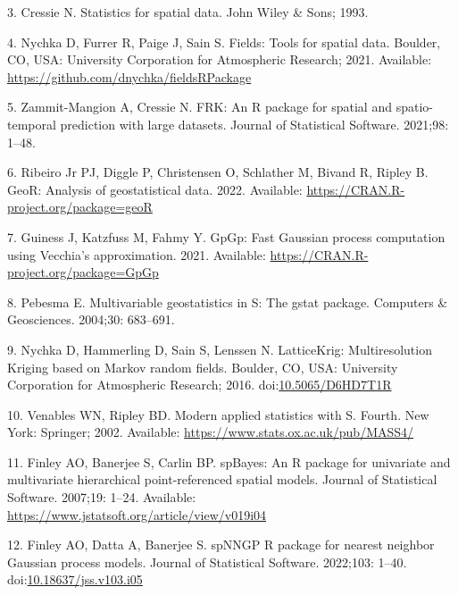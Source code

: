 \documentclass[10pt,letterpaper]{article}
\begin{document}
\leavevmode\hypertarget{ref-cressie1993statistics}{}%
3. Cressie N. Statistics for spatial data. John Wiley \& Sons; 1993.

\leavevmode\hypertarget{ref-nychka2021fields}{}%
4. Nychka D, Furrer R, Paige J, Sain S. Fields: Tools for spatial data.
Boulder, CO, USA: University Corporation for Atmospheric Research; 2021.
Available: \url{https://github.com/dnychka/fieldsRPackage}

\leavevmode\hypertarget{ref-zammitmangion2021FRK}{}%
5. Zammit-Mangion A, Cressie N. FRK: An R package for spatial and
spatio-temporal prediction with large datasets. Journal of Statistical
Software. 2021;98: 1--48.

\leavevmode\hypertarget{ref-ribiero2022geoR}{}%
6. Ribeiro Jr PJ, Diggle P, Christensen O, Schlather M, Bivand R, Ripley
B. GeoR: Analysis of geostatistical data. 2022. Available:
\url{https://CRAN.R-project.org/package=geoR}

\leavevmode\hypertarget{ref-guiness2021gpgp}{}%
7. Guiness J, Katzfuss M, Fahmy Y. GpGp: Fast Gaussian process
computation using Vecchia's approximation. 2021. Available:
\url{https://CRAN.R-project.org/package=GpGp}

\leavevmode\hypertarget{ref-pebesma2004gstat}{}%
8. Pebesma E. Multivariable geostatistics in S: The gstat package.
Computers \& Geosciences. 2004;30: 683--691.

\leavevmode\hypertarget{ref-nychka2016latticekrig}{}%
9. Nychka D, Hammerling D, Sain S, Lenssen N. LatticeKrig:
Multiresolution Kriging based on Markov random fields. Boulder, CO, USA:
University Corporation for Atmospheric Research; 2016.
doi:\href{https://doi.org/10.5065/D6HD7T1R}{10.5065/D6HD7T1R}

\leavevmode\hypertarget{ref-venables2002S}{}%
10. Venables WN, Ripley BD. Modern applied statistics with S. Fourth.
New York: Springer; 2002. Available:
\url{https://www.stats.ox.ac.uk/pub/MASS4/}

\leavevmode\hypertarget{ref-finley2007spbayes}{}%
11. Finley AO, Banerjee S, Carlin BP. spBayes: An R package for
univariate and multivariate hierarchical point-referenced spatial
models. Journal of Statistical Software. 2007;19: 1--24. Available:
\url{https://www.jstatsoft.org/article/view/v019i04}

\leavevmode\hypertarget{ref-finley2002spnngp}{}%
12. Finley AO, Datta A, Banerjee S. spNNGP R package for nearest
neighbor Gaussian process models. Journal of Statistical Software.
2022;103: 1--40.
doi:\href{https://doi.org/10.18637/jss.v103.i05}{10.18637/jss.v103.i05}
\end{document}
